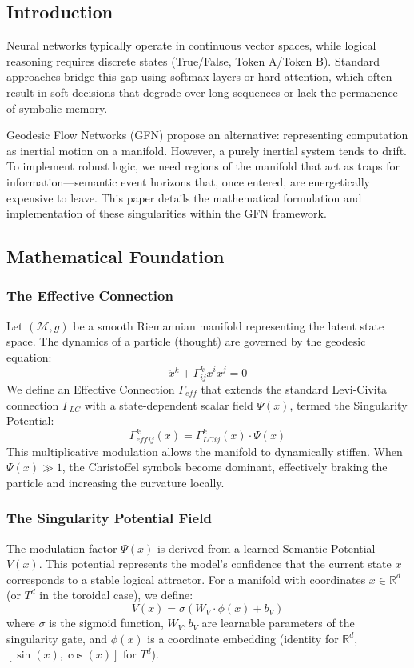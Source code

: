 \documentclass{article}
\numberwithin{equation}{section}
\begin{document}
\subsection{Introduction}
Neural networks typically operate in continuous vector spaces, while logical reasoning requires discrete states (True/False, Token A/Token B). Standard approaches bridge this gap using softmax layers or hard attention, which often result in soft decisions that degrade over long sequences or lack the permanence of symbolic memory.

Geodesic Flow Networks (GFN) propose an alternative: representing computation as inertial motion on a manifold. However, a purely inertial system tends to drift. To implement robust logic, we need regions of the manifold that act as traps for information—semantic event horizons that, once entered, are energetically expensive to leave. This paper details the mathematical formulation and implementation of these singularities within the GFN framework.

\subsection{Mathematical Foundation}
\subsubsection{The Effective Connection}
Let $(\mathcal{M}, g)$ be a smooth Riemannian manifold representing the latent state space. The dynamics of a particle (thought) are governed by the geodesic equation:
\[
\ddot{x}^k + \Gamma^k_{ij} \dot{x}^i \dot{x}^j = 0
\]
We define an Effective Connection $\Gamma_{eff}$ that extends the standard Levi-Civita connection $\Gamma_{LC}$ with a state-dependent scalar field $\Psi(x)$, termed the Singularity Potential:
\[
\Gamma_{eff}^k_{ij}(x) = \Gamma_{LC}^k_{ij}(x) \cdot \Psi(x)
\]
This multiplicative modulation allows the manifold to dynamically stiffen. When $\Psi(x) \gg 1$, the Christoffel symbols become dominant, effectively braking the particle and increasing the curvature locally.

\subsubsection{The Singularity Potential Field}
The modulation factor $\Psi(x)$ is derived from a learned Semantic Potential $V(x)$. This potential represents the model's confidence that the current state $x$ corresponds to a stable logical attractor.
For a manifold with coordinates $x \in \mathbb{R}^d$ (or $T^d$ in the toroidal case), we define:
\[
V(x) = \sigma(W_V \cdot \phi(x) + b_V)
\]
where $\sigma$ is the sigmoid function, $W_V, b_V$ are learnable parameters of the singularity gate, and $\phi(x)$ is a coordinate embedding (identity for $\mathbb{R}^d$, $[\sin(x), \cos(x)]$ for $T^d$).
\end{document}
